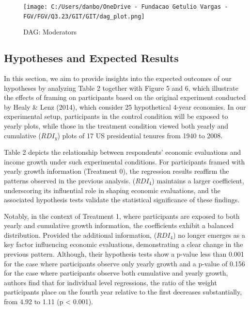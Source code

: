 \documentclass[
]{article}
\begin{document}
\begin{figure}
\hypertarget{fig:label}{%
\centering
\texttt{[image: C:/Users/danbo/OneDrive - Fundacao Getulio Vargas - FGV/FGV/Q3.23/GIT/GIT/dag\_plot.png]}
\caption{DAG: Moderators}\label{fig:label}
}
\end{figure}

\hypertarget{hypotheses-and-expected-results}{%
\subsection{Hypotheses and Expected
Results}\label{hypotheses-and-expected-results}}

In this section, we aim to provide insights into the expected outcomes
of our hypotheses by analyzing Table 2 together with Figure 5 and 6,
which illustrate the effects of framing on participants based on the
original experiment conducted by Healy \& Lenz (2014), which consider 25
hypothetical 4-year economies. In our experimental setup, participants
in the control condition will be exposed to yearly plots, while those in
the treatment condition viewed both yearly and cumulative (\(RDI_y\))
plots of 17 US presidential tenures from 1940 to 2008.

\begin{center}
  
\end{center}

Table 2 depicts the relationship between respondents' economic
evaluations and income growth under such experimental conditions. For
participants framed with yearly growth information (Treatment 0), the
regression results reaffirm the patterns observed in the previous
analysis. (\(RDI_4\)) maintains a larger coefficient, underscoring its
influential role in shaping economic evaluations, and the associated
hypothesis tests validate the statistical significance of these
findings.

Notably, in the context of Treatment 1, where participants are exposed
to both yearly and cumulative growth information, the coefficients
exhibit a balanced distribution. Provided the additional information,
(\(RDI_4\)) no longer emerges as a key factor influencing economic
evaluations, demonstrating a clear change in the previous pattern.
Although, their hypothesis tests show a p-value less than 0.001 for the
case where participants observe only yearly growth and a p-value of
0.156 for the case where participants observe both cumulative and yearly
growth, authors find that for individual level regressions, the ratio of
the weight participants place on the fourth year relative to the first
decreases substantially, from 4.92 to 1.11 (p \textless{} 0.001).
\end{document}
